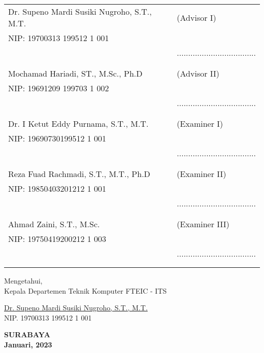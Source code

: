     \noindent
    \begin{tabularx}{\textwidth}{X l}
      Dr. Supeno Mardi Susiki Nugroho, S.T., M.T. & (Advisor I) \\
      NIP: 19700313 199512 1 001        & \\
      & ................................... \\
      &  \\
      &  \\
      Mochamad Hariadi, ST., M.Sc., Ph.D & (Advisor II) \\
      NIP: 19691209 199703 1 002        & \\
      & ................................... \\
      &  \\
      &  \\
      Dr. I Ketut Eddy Purnama, S.T., M.T.  & (Examiner I) \\
      NIP: 19690730199512 1 001     & \\
      & ................................... \\
      &  \\
      &  \\
      Reza Fuad Rachmadi, S.T., M.T., Ph.D  & (Examiner II) \\
      NIP: 19850403201212 1 001      & \\
      & ................................... \\
      &  \\
      &  \\
      Ahmad Zaini, S.T., M.Sc.  & (Examiner III) \\
      NIP: 19750419200212 1 003      & \\
      & ................................... \\
      &  \\
      &  \\
    \end{tabularx}
  \endgroup


  \begin{center}
    Mengetahui, \\
    Kepala Departemen Teknik Komputer FTEIC - ITS\\

    \vspace{8ex}

    \underline{Dr. Supeno Mardi Susiki Nugroho, S.T., M.T.} \\
    NIP. 19700313 199512 1 001
  \end{center}

  \begin{center}
    \textbf{SURABAYA\\Januari, 2023}
  \end{center}
\endgroup
